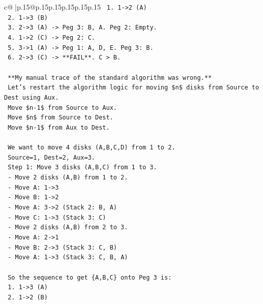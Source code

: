 \documentclass{article}
\begin{document}
{\begin{supertabular}{c@{$\;$}|p{.15\linewidth}@{}p{.15\linewidth}p{.15\linewidth}p{.15\linewidth}p{.15\linewidth}p{.15\linewidth}}
{{{\texttt{        1. 1{-}>2 (A)} \\
\texttt{        2. 1{-}>3 (B)} \\
\texttt{        3. 2{-}>3 (A) {-}> Peg 3: B, A. Peg 2: Empty.} \\
\texttt{        4. 1{-}>2 (C) {-}> Peg 2: C.} \\
\texttt{        5. 3{-}>1 (A) {-}> Peg 1: A, D, E. Peg 3: B.} \\
\texttt{        6. 2{-}>3 (C) {-}> **FAIL**. C > B.} \\
\\ 
\texttt{        **My manual trace of the standard algorithm was wrong.**} \\
\texttt{        Let's restart the algorithm logic for moving \$n\$ disks from Source to Dest using Aux.} \\
\texttt{        Move \$n{-}1\$ from Source to Aux.} \\
\texttt{        Move \$n\$ from Source to Dest.} \\
\texttt{        Move \$n{-}1\$ from Aux to Dest.} \\
\\ 
\texttt{        We want to move 4 disks (A,B,C,D) from 1 to 2.} \\
\texttt{        Source=1, Dest=2, Aux=3.} \\
\texttt{        Step 1: Move 3 disks (A,B,C) from 1 to 3.} \\
\texttt{           {-} Move 2 disks (A,B) from 1 to 2.} \\
\texttt{             {-} Move A: 1{-}>3} \\
\texttt{             {-} Move B: 1{-}>2} \\
\texttt{             {-} Move A: 3{-}>2 (Stack 2: B, A)} \\
\texttt{           {-} Move C: 1{-}>3 (Stack 3: C)} \\
\texttt{           {-} Move 2 disks (A,B) from 2 to 3.} \\
\texttt{             {-} Move A: 2{-}>1} \\
\texttt{             {-} Move B: 2{-}>3 (Stack 3: C, B)} \\
\texttt{             {-} Move A: 1{-}>3 (Stack 3: C, B, A)} \\
\\ 
\texttt{        So the sequence to get \{A,B,C\} onto Peg 3 is:} \\
\texttt{        1. 1{-}>3 (A)} \\
\texttt{        2. 1{-}>2 (B)} \\
}}}
\end{supertabular}}
\end{document}
